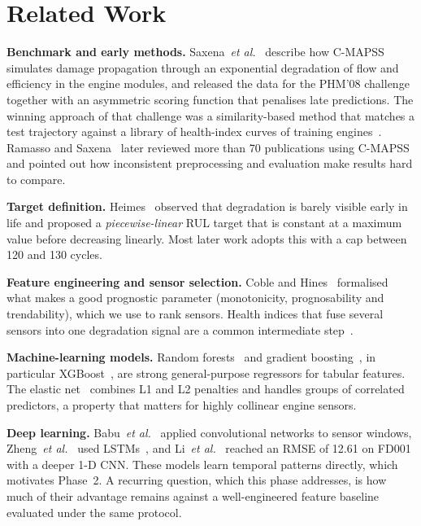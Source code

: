 \documentclass[conference]{IEEEtran}
\begin{document}
\section{Related Work}
\textbf{Benchmark and early methods.} Saxena~\emph{et al.}~\cite{saxena2008damage} describe how C-MAPSS simulates damage propagation through an exponential degradation of flow and efficiency in the engine modules, and released the data for the PHM'08 challenge together with an asymmetric scoring function that penalises late predictions. The winning approach of that challenge was a similarity-based method that matches a test trajectory against a library of health-index curves of training engines~\cite{wang2008similarity}. Ramasso and Saxena~\cite{ramasso2014benchmark} later reviewed more than 70 publications using C-MAPSS and pointed out how inconsistent preprocessing and evaluation make results hard to compare.

\textbf{Target definition.} Heimes~\cite{heimes2008rnn} observed that degradation is barely visible early in life and proposed a \emph{piecewise-linear} RUL target that is constant at a maximum value before decreasing linearly. Most later work adopts this with a cap between 120 and 130 cycles.

\textbf{Feature engineering and sensor selection.} Coble and Hines~\cite{coble2009prognostic} formalised what makes a good prognostic parameter (monotonicity, prognosability and trendability), which we use to rank sensors. Health indices that fuse several sensors into one degradation signal are a common intermediate step~\cite{wang2008similarity,lei2018review}.

\textbf{Machine-learning models.} Random forests~\cite{breiman2001rf} and gradient boosting~\cite{friedman2001gbm}, in particular XGBoost~\cite{chen2016xgboost}, are strong general-purpose regressors for tabular features. The elastic net~\cite{zou2005elasticnet} combines L1 and L2 penalties and handles groups of correlated predictors, a property that matters for highly collinear engine sensors.

\textbf{Deep learning.} Babu~\emph{et al.}~\cite{babu2016cnn} applied convolutional networks to sensor windows, Zheng~\emph{et al.}~\cite{zheng2017lstm} used LSTMs~\cite{hochreiter1997lstm}, and Li~\emph{et al.}~\cite{li2018dcnn} reached an RMSE of 12.61 on FD001 with a deeper 1-D CNN. These models learn temporal patterns directly, which motivates Phase~2. A recurring question, which this phase addresses, is how much of their advantage remains against a well-engineered feature baseline evaluated under the same protocol.
\end{document}
